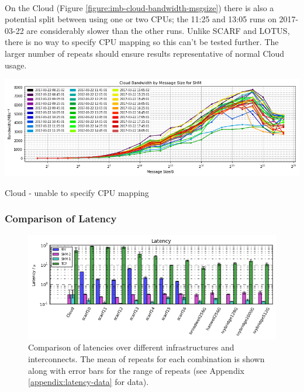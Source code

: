 \documentclass{article}
\begin{document}
            \paragraph{} On the Cloud (Figure \ref{figure:imb-cloud-bandwidth-msgsize}) there is also a potential split between using one or two CPUs; the 11:25 and 13:05 runs on 2017-03-22 are considerably slower than the other runs. Unlike SCARF and LOTUS, there is no way to specify CPU mapping so this can't be tested further. The larger number of repeats should ensure results representative of normal Cloud usage.

            \begin{center}
                \includegraphics[width=\textwidth]{cloud_bandwidth-msgsize_shm}
                \captionsetup{type=figure}
                \caption{Cloud - unable to specify CPU mapping}
                \label{figure:imb-cloud-bandwidth-msgsize}
            \end{center}

        \subsubsection{Comparison of Latency}
            \label{analyse-results-imb-latency}

            \begin{figure}[H]
                \centering
                \includegraphics[width=\textwidth]{compare_latency-hostgroup}
                \caption{Comparison of latencies over different infrastructures and interconnects. The mean of repeats for each combination is shown along with error bars for the range of repeats (see Appendix \ref{appendix:latency-data} for data).}
                \label{fig:compare_latency-hostgroup}
            \end{figure}
\end{document}
